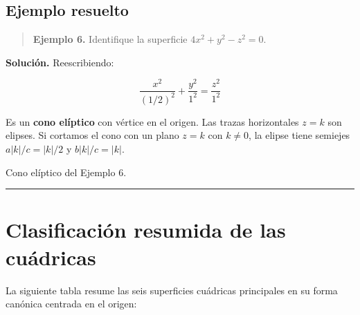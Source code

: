 \documentclass[
]{book}
\begin{document}
\subsection{Ejemplo resuelto}\label{ejemplo-resuelto-21}

\begin{quote}
\textbf{Ejemplo 6.} Identifique la superficie \(4x^2 + y^2 - z^2 = 0\).
\end{quote}

\textbf{Solución.} Reescribiendo:

\[
\frac{x^2}{(1/2)^2} + \frac{y^2}{1^2} = \frac{z^2}{1^2}
\]

Es un \textbf{cono elíptico} con vértice en el origen. Las trazas horizontales \(z = k\) son elipses. Si cortamos el cono con un plano \(z = k\) con \(k \neq 0\), la elipse tiene semiejes \(a|k|/c = |k|/2\) y \(b|k|/c = |k|\).

\label{fig:cono-ejemplo}Cono elíptico del Ejemplo 6.

\begin{center}\rule{0.5\linewidth}{0.5pt}\end{center}

\section{Clasificación resumida de las cuádricas}\label{clasificaciuxf3n-resumida-de-las-cuuxe1dricas}

La siguiente tabla resume las seis superficies cuádricas principales en su forma canónica centrada en el origen:
\end{document}
